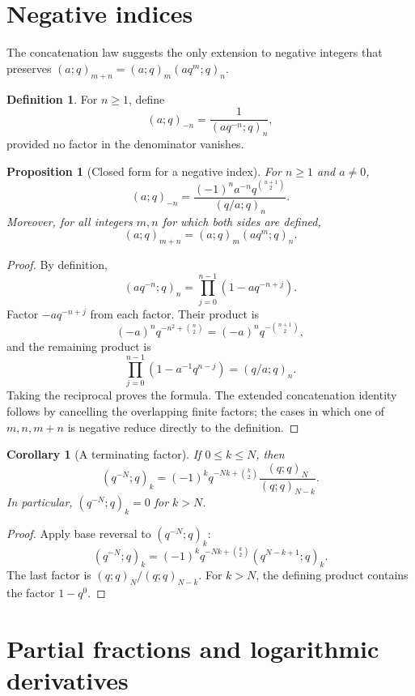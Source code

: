 \documentclass[11pt,oneside,openany]{book}
\newtheorem{proposition}[theorem]{Proposition}
\newtheorem{corollary}[theorem]{Corollary}
\theoremstyle{definition}
\newtheorem{definition}[theorem]{Definition}
\theoremstyle{remark}
\begin{document}
\section{Negative indices}

The concatenation law suggests the only extension to negative integers that preserves
\((a;q)_{m+n}=(a;q)_m(aq^m;q)_n\).

\begin{definition}
For $n\ge1$, define
\[
 (a;q)_{-n}=\frac{1}{(aq^{-n};q)_n},
\]
provided no factor in the denominator vanishes.
\end{definition}

\begin{proposition}[Closed form for a negative index]\label{prop:negative-index}
For $n\ge1$ and $a\ne0$,
\[
 (a;q)_{-n}
 =\frac{(-1)^n a^{-n}q^{\binom{n+1}{2}}}{(q/a;q)_n}.
\]
Moreover, for all integers $m,n$ for which both sides are defined,
\[
 (a;q)_{m+n}=(a;q)_m(aq^m;q)_n.
\]
\end{proposition}

\begin{proof}
By definition,
\[
 (aq^{-n};q)_n=\prod_{j=0}^{n-1}(1-aq^{-n+j}).
\]
Factor $-a q^{-n+j}$ from each factor.  Their product is
\[
 (-a)^nq^{-n^2+\binom n2}=(-a)^nq^{-\binom{n+1}{2}},
\]
and the remaining product is
\[
 \prod_{j=0}^{n-1}(1-a^{-1}q^{n-j})=(q/a;q)_n.
\]
Taking the reciprocal proves the formula.  The extended concatenation identity follows by cancelling the overlapping finite factors; the cases in which one of $m,n,m+n$ is negative reduce directly to the definition.
\end{proof}

\begin{corollary}[A terminating factor]\label{cor:qminusN}
If $0\le k\le N$, then
\[
 (q^{-N};q)_k=(-1)^kq^{-Nk+\binom k2}
 \frac{(q;q)_N}{(q;q)_{N-k}}.
\]
In particular, $(q^{-N};q)_k=0$ for $k>N$.
\end{corollary}

\begin{proof}
Apply base reversal to $(q^{-N};q)_k$:
\[
 (q^{-N};q)_k=(-1)^kq^{-Nk+\binom k2}(q^{N-k+1};q)_k.
\]
The last factor is $(q;q)_N/(q;q)_{N-k}$.  For $k>N$, the defining product contains the factor $1-q^0$.
\end{proof}

\section{Partial fractions and logarithmic derivatives}
\end{document}
